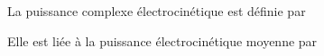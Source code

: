 \documentclass[a4paper]{article}
\begin{document}
\pagestyle{fancy}
\fancyhf{}
\setlength{\headheight}{15pt}

\begin{center}
	\large{}
\end{center}


La puissance complexe électrocinétique est définie par
\begin{center}
\end{center}
Elle est liée à la puissance électrocinétique moyenne par
\begin{center}
\end{center}
\end{document}
